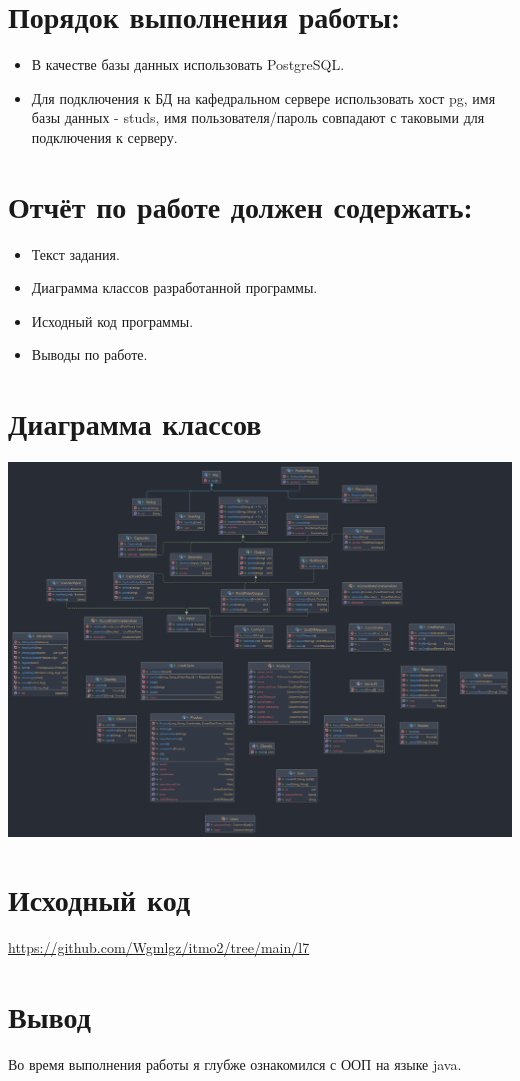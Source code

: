 \documentclass{article}
\begin{document}
\section*{Порядок выполнения работы:}

\begin{itemize}
  \item В качестве базы данных использовать PostgreSQL.
  \item Для подключения к БД на кафедральном сервере использовать хост pg, имя базы данных - studs, имя пользователя/пароль совпадают с таковыми для подключения к серверу.
\end{itemize}

\section*{Отчёт по работе должен содержать:}

\begin{itemize}
  \item Текст задания.
  \item Диаграмма классов разработанной программы.
  \item Исходный код программы.
  \item Выводы по работе.
\end{itemize}

\section*{Диаграмма классов}

\begin{center}
  \includegraphics[scale=0.10]{diagram.png}
\end{center}

\section*{Исходный код}
\url{https://github.com/Wgmlgz/itmo2/tree/main/l7}

\section*{Вывод}
Во время выполнения работы я глубже ознакомился с ООП на языке java.
\end{document}
